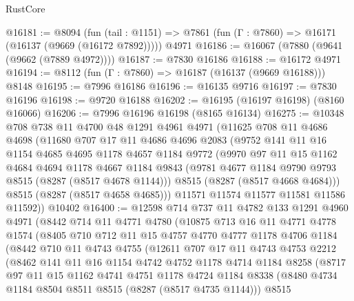 \begin{lexlean}{RustCore}
\begin{coremodule}
@16181 := @8094
    (fun (tail : @1151) => @7861 (fun (Γ : @7860) => @16171 (@16137 (@9669 (@16172 @7892)))))
    @4971
@16186 := @16067 (@7880 (@9641 (@9662 (@7889 @4972))))
@16187 := @7830 @16186
@16188 := @16172 @4971
@16194 := @8112 (fun (Γ : @7860) => @16187 (@16137 (@9669 @16188))) @8148
@16195 := @7996 @16186
@16196 := @16135 @9716
@16197 := @7830 @16196
@16198 := @9720 @16188
@16202 := @16195 (@16197 @16198) (@8160 @16066)
@16206 := @7996 @16196 @16198 (@8165 @16134)
@16275 := @10348
    @708
    @738
    @11
    @4700
    @48
    @1291
    @4961
    @4971
    (@11625
      @708
      @11
      @4686
      @4698
      (@11680
        @707
        @17
        @11
        @4686
        @4696
        @2083
        (@9752
          @141
          @11
          @16
          @1154
          @4685
          @4695
          @1178
          @4657
          @1184
          @9772
          (@9970
            @97
            @11
            @15
            @1162
            @4684
            @4694
            @1178
            @4667
            @1184
            @9843
            (@9781 @4677 @1184 @9790 @9793 @8515 (@8287 (@8517 @4678 @1144)))
            @8515
            (@8287 (@8517 @4668 @4684)))
          @8515
          (@8287 (@8517 @4658 @4685)))
        @11571
        @11574
        @11577
        @11581
        @11586
        @11592))
    @10402
@16400 := @12598
    @714
    @737
    @11
    @4782
    @133
    @1291
    @4960
    @4971
    (@8442
      @714
      @11
      @4771
      @4780
      (@10875
        @713
        @16
        @11
        @4771
        @4778
        @1574
        (@8405
          @710
          @712
          @11
          @15
          @4757
          @4770
          @4777
          @1178
          @4706
          @1184
          (@8442
            @710
            @11
            @4743
            @4755
            (@12611
              @707
              @17
              @11
              @4743
              @4753
              @2212
              (@8462
                @141
                @11
                @16
                @1154
                @4742
                @4752
                @1178
                @4714
                @1184
                @8258
                (@8717
                  @97
                  @11
                  @15
                  @1162
                  @4741
                  @4751
                  @1178
                  @4724
                  @1184
                  @8338
                  (@8480 @4734 @1184 @8504 @8511 @8515 (@8287 (@8517 @4735 @1144)))
                  @8515

\end{coremodule}
\end{lexlean}
